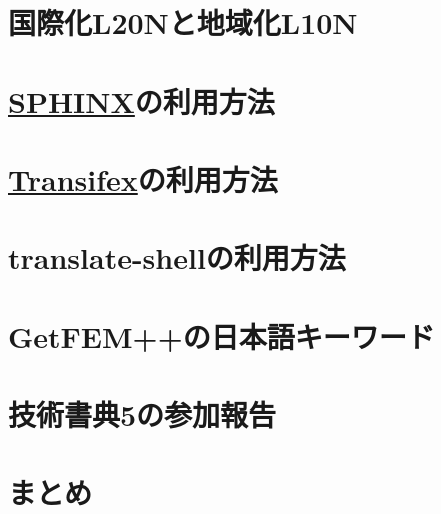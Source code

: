\documentclass{../../style/ltjoc}
\begin{document}
\section{国際化L20Nと地域化L10N}
\section{\href{http://www.sphinx-doc.org/en/master}{SPHINX}の利用方法}
\section{\href{https://www.transifex.com}{Transifex}の利用方法}
\section{translate-shellの利用方法}
\section{GetFEM++の日本語キーワード}
\section{技術書典5の参加報告}
\section{まとめ}
\end{document}
